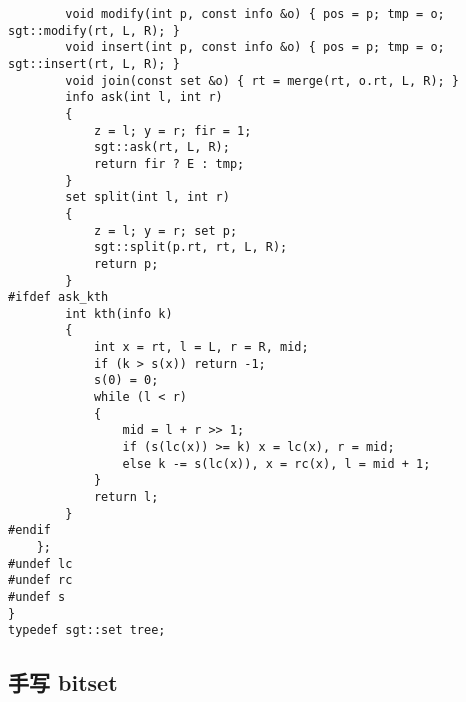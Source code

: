 \documentclass[12pt]{ctexart}
\begin{document}
\begin{lstlisting}
		void modify(int p, const info &o) { pos = p; tmp = o; sgt::modify(rt, L, R); }
		void insert(int p, const info &o) { pos = p; tmp = o; sgt::insert(rt, L, R); }
		void join(const set &o) { rt = merge(rt, o.rt, L, R); }
		info ask(int l, int r)
		{
			z = l; y = r; fir = 1;
			sgt::ask(rt, L, R);
			return fir ? E : tmp;
		}
		set split(int l, int r)
		{
			z = l; y = r; set p;
			sgt::split(p.rt, rt, L, R);
			return p;
		}
#ifdef ask_kth
		int kth(info k)
		{
			int x = rt, l = L, r = R, mid;
			if (k > s(x)) return -1;
			s(0) = 0;
			while (l < r)
			{
				mid = l + r >> 1;
				if (s(lc(x)) >= k) x = lc(x), r = mid;
				else k -= s(lc(x)), x = rc(x), l = mid + 1;
			}
			return l;
		}
#endif
	};
#undef lc
#undef rc
#undef s
}
typedef sgt::set tree;
\end{lstlisting}

\subsection{手写 bitset}
\end{document}
